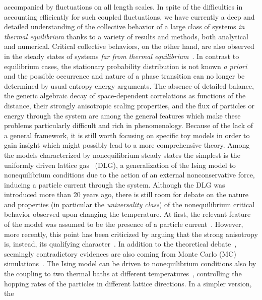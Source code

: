 \documentclass[aps,prl,twocolumn,floatfix,amssymb,showpacs]{revtex4}
\begin{document}
  accompanied by fluctuations on all length scales.
  In spite of the difficulties in accounting efficiently for such coupled 
  fluctuations, we have currently a deep and detailed
  understanding of the collective behavior of a large class of systems 
  {\it in thermal equilibrium} thanks to a variety of results and methods, both
  analytical and numerical.
  Critical collective behaviors, 
  on the other hand, are also observed in the steady
  states of systems {\it far from thermal equilibrium}~\cite{Zia}.
  In contrast to equilibrium cases, 
  the stationary probability distribution is not known {\it a priori}
  and the possible occurrence and nature of a phase transition can no longer be
  determined by usual entropy-energy arguments.
  The absence of detailed balance, the generic algebraic decay
  of space-dependent correlations as functions of the distance, their
  strongly anisotropic scaling properties, 
  and the flux of particles or energy through the system are among
  the general features which make these problems particularly difficult and
  rich in phenomenology.
  Because of the lack of a general framework, it is still worth
  focusing on specific toy models in order to gain insight 
  which might possibly lead to a more comprehensive theory.
  Among the models characterized by nonequilibrium steady
  states the simplest is the uniformly driven lattice
  gas~\cite{KLS} (DLG), a generalization of the 
  Ising model to
  nonequilibrium conditions due to the action of an external
  nonconservative force, inducing a particle current through
  the system.
  Although the DLG was introduced more than 20 years ago, there is
  still room for debate on the nature and properties (in particular the
  {\it universality class}) of the nonequilibrium 
  critical behavior 
  observed upon changing the temperature. 
  At first, the relevant feature of the model was
  assumed  to be the presence of a particle current~\cite{Janssen86a}.
  However, more recently, this point has been criticized
  by arguing that the strong anisotropy is, instead, its qualifying
  character~\cite{Garrido,Achahbar}. In addition to the theoretical
  debate~\cite{dream-team}, seemingly contradictory evidences are also
  coming from Monte Carlo (MC)
  simulations~\cite{Achahbar,noi,Albano,reweight}.
  The Ising model can be driven to nonequilibrium conditions also by
  the coupling to two thermal baths
  at different temperatures~\cite{first}, 
  controlling the hopping rates of the 
  particles in different lattice directions. In a simpler version, the
\end{document}
